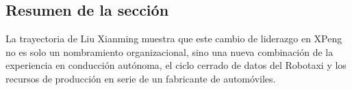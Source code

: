 \subsection{Resumen de la sección}

La trayectoria de Liu Xianming muestra que este cambio de liderazgo en XPeng no es solo un nombramiento organizacional, sino una nueva combinación de la experiencia en conducción autónoma, el ciclo cerrado de datos del Robotaxi y los recursos de producción en serie de un fabricante de automóviles.
